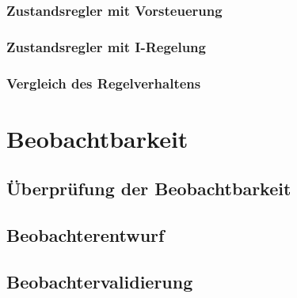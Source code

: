 \documentclass[
	pagesize,
	fontsize=12pt,
	paper=a4,
	oneside,
   reqno
]{scrartcl}
\begin{document}
\subsubsection{Zustandsregler mit Vorsteuerung}

\subsubsection{Zustandsregler mit I-Regelung}

\subsubsection{Vergleich des Regelverhaltens}

\clearpage

\section{Beobachtbarkeit}

\subsection{Überprüfung der Beobachtbarkeit}

\subsection{Beobachterentwurf}

\subsection{Beobachtervalidierung}

\newpage
\newcount\Quellennummer
{}

\renewcommand\refname{Literaturverzeichnis}
\end{document}
